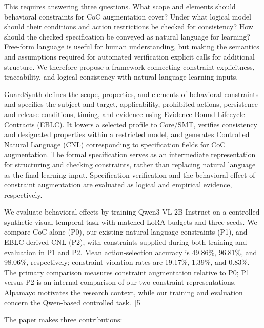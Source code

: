 \documentclass[11pt,a4paper]{article}
\begin{document}
This requires answering three questions. What scope and elements should behavioral constraints for CoC augmentation cover? Under what logical model should their conditions and action restrictions be checked for consistency? How should the checked specification be conveyed as natural language for learning? Free-form language is useful for human understanding, but making the semantics and assumptions required for automated verification explicit calls for additional structure. We therefore propose a framework connecting constraint explicitness, traceability, and logical consistency with natural-language learning inputs.\par\vspace{5pt}
GuardSynth defines the scope, properties, and elements of behavioral constraints and specifies the subject and target, applicability, prohibited actions, persistence and release conditions, timing, and evidence using Evidence-Bound Lifecycle Contracts (EBLC). It lowers a selected profile to Core/SMT, verifies consistency and designated properties within a restricted model, and generates Controlled Natural Language (CNL) corresponding to specification fields for CoC augmentation. The formal specification serves as an intermediate representation for structuring and checking constraints, rather than replacing natural language as the final learning input. Specification verification and the behavioral effect of constraint augmentation are evaluated as logical and empirical evidence, respectively.\par\vspace{5pt}
We evaluate behavioral effects by training Qwen3-VL-2B-Instruct on a controlled synthetic visual-temporal task with matched LoRA budgets and three seeds. We compare CoC alone (P0), our existing natural-language constraints (P1), and EBLC-derived CNL (P2), with constraints supplied during both training and evaluation in P1 and P2. Mean action-selection accuracy is 49.86\%, 96.81\%, and 98.06\%, respectively; constraint-violation rates are 19.17\%, 1.39\%, and 0.83\%. The primary comparison measures constraint augmentation relative to P0; P1 versus P2 is an internal comparison of our two constraint representations. Alpamayo motivates the research context, while our training and evaluation concern the Qwen-based controlled task.~\href{\detokenize{../temporal-experiment-closure-2026-09-29-001/all_primary_metrics.csv}}{[5]}\par\vspace{5pt}
The paper makes three contributions:\par\vspace{5pt}
\end{document}
